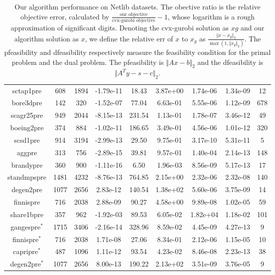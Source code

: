 \documentclass[a4paper]{article}
\begin{document}
\begin{table}[h]
{\begin{tabular}{ccccccccc}
			sctap1pre &  608 & 1894 & -1.79e-11 &18.43 & 3.87e+00 & 1.74e-06 & 1.34e-09 & 12 \\
			bore3dpre & 142 & 320 & -1.52e-07 &77.04 & 6.63e-01 & 5.55e-06 & 1.12e-09 & 678 \\
			\hline 
			scagr25pre &  949 & 2044 & -8.15e-13 &231.54 & 1.13e-01 & 1.78e-07 & 3.46e-12 & 49 \\
			boeing2pre &  374 & 884 & -1.02e-11 &186.65 & 3.49e-01 & 4.56e-06 & 1.01e-12 & 320 \\
			scsd1pre &  914 & 3194 & -2.99e-13 &29.50 & 9.75e-01 & 3.17e-10 & 5.31e-11 & 5 \\
			aggpre &  313 & 756 & -2.89e-15 &39.81 & 9.57e-01 & 1.40e-04 & 2.14e-13 & 148 \\
			brandypre &  360 & 900 & -1.11e-16 & 6.50 & 1.96e-03 & 8.56e-09 & 5.17e-13 & 17 \\
			\hline 
			standmpspre & 1481 & 4232 & -8.76e-13 &764.85 & 2.15e+00 & 2.32e-06 & 2.32e-08 & 140 \\
			degen2pre & 1077 & 2656 & 2.83e-12 &140.54 & 1.38e+02 & 5.60e-06 & 3.75e-09 & 14 \\
			finnispre &  716 & 2038 & 2.88e-09 &90.27 & 4.58e+00 & 9.89e-08 & 1.02e-05 & 59 \\
			share1bpre &   357 & 962 & -1.92e-03 &89.53 & 6.05e-02 & 1.82e+04 & 1.18e-02 & 101  \\
			gangespre$^*$ &  1715 & 3406 & -2.16e-14 &328.96 & 8.59e-02 & 4.45e-09 & 4.27e-13 & 9 \\
			\hline 
			finnispre$^*$  &  716 & 2038 & 1.71e-08 &27.06 & 8.34e-01 & 2.12e-06 & 1.15e-05 & 10 \\
			capripre$^*$ &  487 & 1096 & 1.11e-12 &93.54 & 4.23e-02 & 8.46e-08 & 2.23e-13 & 38 \\
			degen2pre$^*$  &  1077 & 2656 & 8.00e-13 &190.22 & 2.13e+02 & 3.51e-09 & 3.76e-05 & 9 \\
			
			\hline
			
	\end{tabular}}
	\caption{ Our algorithm performance on Netlib datasets. The obective ratio is the relative objective error, calculated by $ \frac{\textrm{our objective}}{\textrm{cvx-gurobi objective}} -1$, whose logarithm is a rough approximation of significant digits. Denoting the cvx-gurobi solution as $xg$ and our algorithm solution as $x$, we define the relative err of $x$ to $x_g$ as $\frac{\Vert x-x_g\Vert_2}{\max(1,\Vert x_g\Vert_2)}$. The pfeasibility and dfeasibility respectively measure the feasibility condition for the primal problem and the dual problem. The pfeasibility is $\Vert Ax-b\Vert_2$ and the dfeasibility is $\Vert A^Ty-s-c\Vert_2$. }
	\label{tab:netlib}
\end{table}
\end{document}
